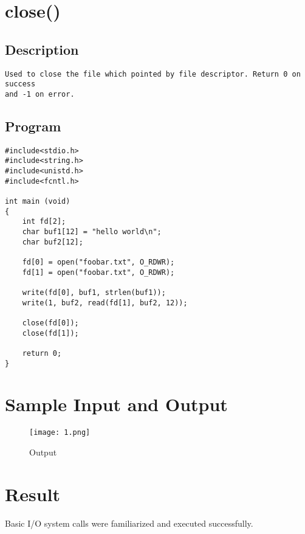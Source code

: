 \documentclass{article}
\begin{document}
\section{close()}
\subsection{Description}
\begin{Verbatim}[tabsize = 4]
Used to close the file which pointed by file descriptor. Return 0 on success 
and -1 on error. 

\end{Verbatim}

\subsection{Program}
\begin{Verbatim}[tabsize = 4]
#include<stdio.h>
#include<string.h>
#include<unistd.h>
#include<fcntl.h>

int main (void)
{
	int fd[2];
	char buf1[12] = "hello world\n";
	char buf2[12];
	
	fd[0] = open("foobar.txt", O_RDWR);		
	fd[1] = open("foobar.txt", O_RDWR);
	
	write(fd[0], buf1, strlen(buf1));		
	write(1, buf2, read(fd[1], buf2, 12));

	close(fd[0]);
	close(fd[1]);

	return 0;
}
\end{Verbatim}

\section*{Sample Input and Output}
\begin{figure}[H]
    \centering
    \texttt{[image: 1.png]}
    \caption{Output}
    \label{fig:my_label2}
\end{figure}

\section*{\Large Result}
    Basic I/O system calls were familiarized and executed successfully.
\end{document}
